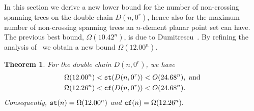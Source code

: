 \documentclass[11pt]{article}
\newtheorem{theorem}{Theorem}
\def\st{{\tt st}}
\def\cf{{\tt cf}}
\begin{document}
In this section we derive a new lower bound for the number of
non-crossing spanning trees on the double-chain $D(n,0^r)$,
hence also for the maximum number of non-crossing spanning trees
an $n$-element planar point set can have.
The previous best bound, $\Omega(10.42^n)$, is due to Dumitrescu~\cite{D02}.
By refining the analysis of~\cite{D02} we obtain a new bound $\Omega(12.00^n)$.
\begin{theorem}\label{thm:lbst}
For the double chain $D(n,0^r)$, we have
\begin{align*}
\Omega(12.00^n) < \st(D(n,0^r)) & < O(24.68^n), \text{ and} \\
\Omega(12.26^n) < \cf(D(n,0^r)) & < O(24.68^n).
\end{align*}
Consequently, $\st(n)= \Omega(12.00^n)$ and $\cf(n)=\Omega(12.26^n).$
\end{theorem}
\end{document}
